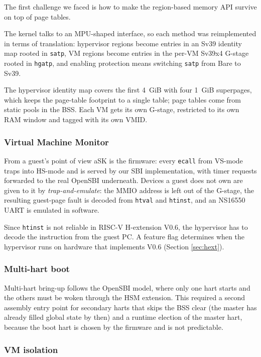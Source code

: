 \documentclass[10pt,a4]{article}
\begin{document}
The first challenge we faced is how to make the region-based memory API survive on
top of page tables. 

The kernel talks to an MPU-shaped interface, so each method
was reimplemented in terms of translation: hypervisor regions become entries in
an Sv39 identity map rooted in \texttt{satp}, VM regions become entries in the
per-VM Sv39x4 G-stage rooted in \texttt{hgatp}, and enabling protection means
switching \texttt{satp} from Bare to Sv39. 

The hypervisor identity map covers the first 4~GiB with four 1~GiB superpages, 
which keeps the page-table footprint to a single table; page tables come from static pools in the BSS. 
Each VM gets its own G-stage, restricted to its own RAM window and tagged with its own VMID.

\subsubsection*{Virtual Machine Monitor}

From a guest's point of view aSK is the firmware: every \texttt{ecall} from VS-mode 
traps into HS-mode and is served by
our SBI implementation, with timer requests forwarded to the real OpenSBI underneath.
Devices a guest does not own are given to it by \emph{trap-and-emulate}: the
MMIO address is left out of the G-stage, the resulting guest-page fault is
decoded from \texttt{htval} and \texttt{htinst}, and an NS16550 UART is emulated
in software.

Since \texttt{htinst} is not reliable in RISC-V H-extension V0.6, the hypervisor has to decode 
the instruction from the guest PC. A feature flag determines when the hypervisor runs on 
hardware that implements V0.6 (Section \ref{sec:hext}). 

\subsubsection*{Multi-hart boot}

Multi-hart bring-up follows the OpenSBI model, where only one hart starts and
the others must be woken through the HSM extension. This required a second
assembly entry point for secondary harts that skips the BSS clear (the master
has already filled global state by then) and a runtime election of the master
hart, because the boot hart is chosen by the firmware and is not predictable.

\subsubsection*{VM isolation}
\end{document}

